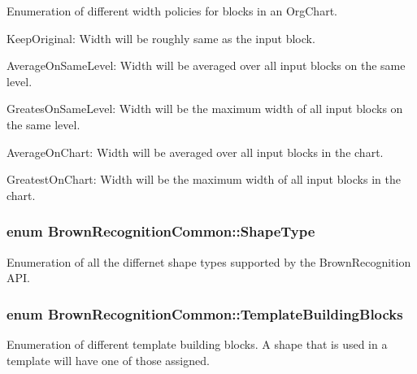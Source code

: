 \-Enumeration of different width policies for blocks in an \-Org\-Chart. 


\begin{DoxyItemize}
\item \-Keep\-Original\-: \-Width will be roughly same as the input block.
\item \-Average\-On\-Same\-Level\-: \-Width will be averaged over all input blocks on the same level.
\item \-Greates\-On\-Same\-Level\-: \-Width will be the maximum width of all input blocks on the same level.
\item \-Average\-On\-Chart\-: \-Width will be averaged over all input blocks in the chart.
\item \-Greatest\-On\-Chart\-: \-Width will be the maximum width of all input blocks in the chart. 
\end{DoxyItemize}\hypertarget{namespace_brown_recognition_common_a86340ddb3d90188573ed7b4484046ec3}{
\subsubsection[{\-Shape\-Type}]{\setlength{\rightskip}{0pt plus 5cm}enum {\bf \-Brown\-Recognition\-Common\-::\-Shape\-Type}}}
\label{namespace_brown_recognition_common_a86340ddb3d90188573ed7b4484046ec3}


\-Enumeration of all the differnet shape types supported by the \-Brown\-Recognition \-A\-P\-I. 

\hypertarget{namespace_brown_recognition_common_a7392e1ad819495147e6f96b995309138}{
\subsubsection[{\-Template\-Building\-Blocks}]{\setlength{\rightskip}{0pt plus 5cm}enum {\bf \-Brown\-Recognition\-Common\-::\-Template\-Building\-Blocks}}}
\label{namespace_brown_recognition_common_a7392e1ad819495147e6f96b995309138}


\-Enumeration of different template building blocks. \-A shape that is used in a template will have one of those assigned. 

